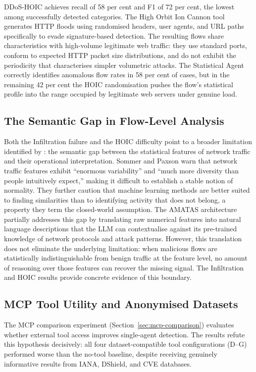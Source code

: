 \documentclass[../main.tex]{subfiles}
\begin{document}
DDoS-HOIC achieves recall of 58 per cent and F1 of 72 per cent, the lowest among successfully detected categories. The High Orbit Ion Cannon tool generates HTTP floods using randomised headers, user agents, and URL paths specifically to evade signature-based detection. The resulting flows share characteristics with high-volume legitimate web traffic: they use standard ports, conform to expected HTTP packet size distributions, and do not exhibit the periodicity that characterises simpler volumetric attacks. The Statistical Agent correctly identifies anomalous flow rates in 58 per cent of cases, but in the remaining 42 per cent the HOIC randomisation pushes the flow's statistical profile into the range occupied by legitimate web servers under genuine load.

\subsection{The Semantic Gap in Flow-Level Analysis}

Both the Infiltration failure and the HOIC difficulty point to a broader limitation identified by \textcite{Sommer2010}: the semantic gap between the statistical features of network traffic and their operational interpretation. Sommer and Paxson warn that network traffic features exhibit ``enormous variability'' and ``much more diversity than people intuitively expect,'' making it difficult to establish a stable notion of normality. They further caution that machine learning methods are better suited to finding similarities than to identifying activity that does not belong, a property they term the closed-world assumption. The AMATAS architecture partially addresses this gap by translating raw numerical features into natural language descriptions that the LLM can contextualise against its pre-trained knowledge of network protocols and attack patterns. However, this translation does not eliminate the underlying limitation: when malicious flows are statistically indistinguishable from benign traffic at the feature level, no amount of reasoning over those features can recover the missing signal. The Infiltration and HOIC results provide concrete evidence of this boundary.

\subsection{MCP Tool Utility and Anonymised Datasets}

The MCP comparison experiment (Section~\ref{sec:mcp-comparison}) evaluates whether external tool access improves single-agent detection. The results refute this hypothesis decisively: all four dataset-compatible tool configurations (D--G) performed worse than the no-tool baseline, despite receiving genuinely informative results from IANA, DShield, and CVE databases.
\end{document}
